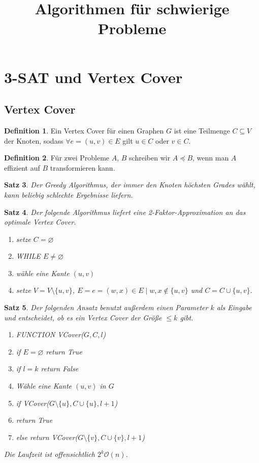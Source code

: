 \documentclass[a4paper, 12pt]{article}
\theoremstyle{plain}
\newtheorem{theorem}{Satz}[section] %
\theoremstyle{definition}
\newtheorem{definition}[theorem]{Definition} %
\theoremstyle{lemma}
\theoremstyle{remark}
\theoremstyle{corollary}
\theoremstyle{example}
\begin{document}
	\begin{titlepage} 
		\title{Algorithmen für schwierige Probleme}
		\clearpage\maketitle
		\thispagestyle{empty}
	\end{titlepage}
	\tableofcontents
	\newpage
	\section{3-SAT und Vertex Cover}
	\subsection{Vertex Cover}
	\begin{definition}
		Ein Vertex Cover für einen Graphen $G$ ist eine Teilmenge $C \subseteq V$ der Knoten, sodass $\forall e = (u,v) \in E$ gilt $u \in C$ oder $v \in C$. 
	\end{definition}
	\begin{definition}
		Für zwei Probleme $A$, $B$ schreiben wir $A \preceq B$, wenn man $A$ effizient auf $B$ transformieren kann.
	\end{definition}
	\begin{theorem}
		Der Greedy Algorithmus, der immer den Knoten höchsten Grades wählt, kann beliebig schlechte Ergebnisse liefern.
	\end{theorem}
	\begin{theorem}
		Der folgende Algorithmus liefert eine 2-Faktor-Approximation an das optimale Vertex Cover.
		\begin{enumerate}
			\item setze $C= \varnothing$
			\item WHILE $E \neq \varnothing$
			\item wähle eine Kante $(u,v)$
			\item setze $V = V\setminus \{u,v\}$, $E = {e = (w,x) \in E \; | \; w,x \notin \{u,v\}}$ und $C = C \cup \{u,v\}$.
		\end{enumerate}
	\end{theorem}
	\begin{theorem}
		Der folgenden Ansatz benutzt außerdem einen Parameter $k$ als Eingabe und entscheidet, ob es ein Vertex Cover der Größe $\leq k$ gibt.
		\begin{enumerate}
			\item FUNCTION VCover($G,C,l$)
			\item if $E = \varnothing$ return True
			\item if $l = k$ return False
			\item Wähle eine Kante $(u,v)$ in $G$
			\item if VCover($G\setminus \{u\}, C \cup \{u\}, l+1$)
			\item return True
			\item else return VCover($G\setminus \{v\}, C\cup \{v\}, l+1$)
		\end{enumerate}
	Die Laufzeit ist offensichtlich $2^k \mathcal{O}(n)$.
	\end{theorem}
\end{document}
